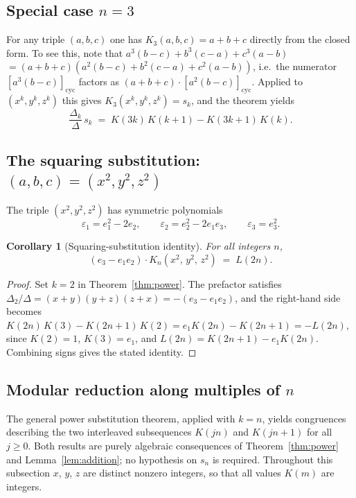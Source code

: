 \documentclass[12pt]{article}
\newtheorem{corollary}[theorem]{Corollary}
\theoremstyle{definition}
\newcommand{\cyc}[1]{\left[#1\right]_{\!\mathrm{cyc}}}
\begin{document}
	\subsection*{Special case $n=3$}
	
	For any triple $(a,b,c)$ one has $K_3(a,b,c) = a+b+c$ directly from the
	closed form.  To see this, note that $a^3(b-c) + b^3(c-a) + c^3(a-b)$
	$= (a+b+c)(a^2(b-c)+b^2(c-a)+c^2(a-b))$, i.e.\ the numerator $\cyc{a^3(b-c)}$ factors as
	$(a+b+c)\cdot\cyc{a^2(b-c)}$.  Applied to $(x^k,y^k,z^k)$ this gives
	$K_3(x^k,y^k,z^k) = s_k$, and the theorem yields
	\[
	\frac{\Delta_k}{\Delta}\, s_k
	\;=\;
	K(3k)\,K(k+1) - K(3k+1)\,K(k).
	\]
	
	\subsection{The squaring substitution: $(a,b,c) = (x^2, y^2, z^2)$}
	
	The triple $(x^2,y^2,z^2)$ has symmetric polynomials
	\[
	\varepsilon_1 = e_1^2-2e_2, \qquad \varepsilon_2 = e_2^2-2e_1e_3, \qquad \varepsilon_3 = e_3^2.
	\]
	
	\begin{corollary}[Squaring-substitution identity]
		\label{thm:squaring}
		For all integers $n$,
		\[
		(e_3 - e_1 e_2)\cdot K_n(x^2,\,y^2,\,z^2) \;=\; L(2n).
		\]
	\end{corollary}
	\begin{proof}
		Set $k=2$ in Theorem~\ref{thm:power}.  The prefactor satisfies
		$\Delta_2/\Delta = (x+y)(y+z)(z+x) = -(e_3-e_1e_2)$, and the
		right-hand side becomes
		$K(2n)\,K(3) - K(2n+1)\,K(2) = e_1 K(2n) - K(2n+1) = -L(2n)$,
		since $K(2)=1$, $K(3)=e_1$, and $L(2n) = K(2n+1)-e_1 K(2n)$.
		Combining signs gives the stated identity.
	\end{proof}
	
	\subsection{Modular reduction along multiples of $n$}
	\label{sec:modular-reduction}
	
	The general power substitution theorem, applied with $k = n$, yields
	congruences describing the two interleaved subsequences $K(jn)$ and
	$K(jn+1)$ for all $j \geq 0$.  Both results are purely algebraic
	consequences of Theorem~\ref{thm:power} and Lemma~\ref{lem:addition};
	no hypothesis on $s_n$ is required.  Throughout this subsection $x$,
	$y$, $z$ are distinct nonzero integers, so that all values $K(m)$ are
	integers.
	
\end{document}
